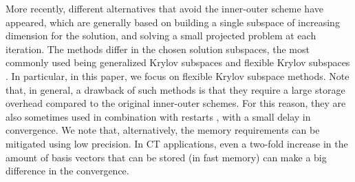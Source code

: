 \documentclass[11pt]{article}
\numberwithin{equation}{section}
\begin{document}
More recently, different alternatives that avoid the inner-outer scheme have appeared, which are generally based on building a single subspace of increasing dimension for the solution, and solving a small projected problem at each iteration. The methods differ in the chosen solution subspaces, the most commonly used being generalized Krylov subspaces \cite{Lanza2015GKS,Huang2017MM} and flexible Krylov subspaces \cite{Gazzola2014GAT, Chung2019lp, Gazzola2021IRW, Gazzola2021Edge}. In particular, in this paper, we focus on flexible Krylov subspace methods. Note that, in general, a drawback of such methods is that they require a large storage overhead compared to the original inner-outer schemes. For this reason, they are also sometimes used in combination with restarts \cite{Buccini2023restart, onisk2025restarts}, with a small delay in convergence. We note that, alternatively, the memory requirements can be mitigated using low precision. In CT applications, even a two-fold increase in the amount of basis vectors that can be stored (in fast memory) can make a big difference in the convergence. \\
\end{document}
